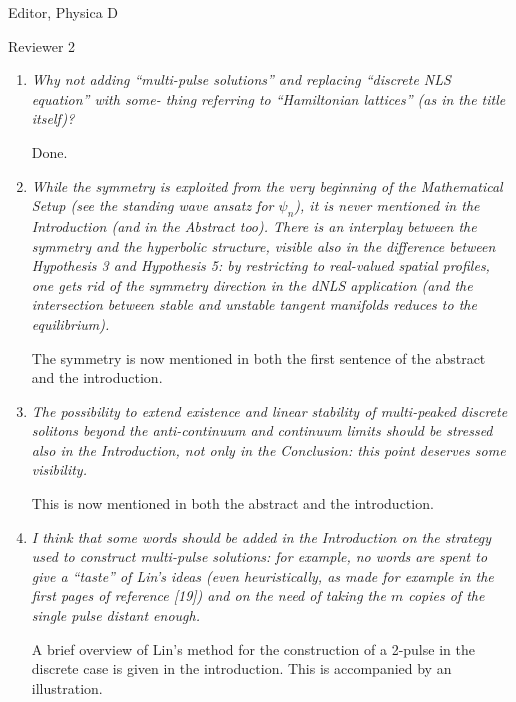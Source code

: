 \documentclass[11pt]{letter}
\begin{document}
\begin{letter}{Editor, Physica D}
\begin{enumerate}
\end{enumerate}

Reviewer 2
\begin{enumerate}
\item \emph{Why not adding ``multi-pulse solutions'' and replacing ``discrete NLS equation'' with some- thing referring to ``Hamiltonian lattices'' (as in the title itself)? }

\vspace{4mm}
Done.
\vspace{4mm}

\item \emph{While the symmetry is exploited from the very beginning of the Mathematical Setup (see the standing wave ansatz for $\psi_n$), it is never mentioned in the Introduction (and in the Abstract too). There is an interplay between the symmetry and the hyperbolic structure, visible also in the difference between Hypothesis 3 and Hypothesis 5: by restricting to real-valued spatial profiles, one gets rid of the symmetry direction in the dNLS application (and the intersection between stable and unstable tangent manifolds reduces to the equilibrium).}

\vspace{4mm}
The symmetry is now mentioned in both the first sentence of the abstract and the introduction.
\vspace{4mm}

\item \emph{The possibility to extend existence and linear stability of multi-peaked discrete solitons beyond the anti-continuum and continuum limits should be stressed also in the Introduction, not only in the Conclusion: this point deserves some visibility.}

\vspace{4mm}
This is now mentioned in both the abstract and the introduction.
\vspace{4mm}

\item \emph{I think that some words should be added in the Introduction on the strategy used to construct multi-pulse solutions: for example, no words are spent to give a “taste” of Lin’s ideas (even heuristically, as made for example in the first pages of reference [19]) and on the need of taking the $m$ copies of the single pulse distant enough.}

\vspace{4mm}
A brief overview of Lin's method for the construction of a 2-pulse in the discrete case is given in the introduction. This is accompanied by an illustration.
\vspace{4mm}


\end{enumerate}
\end{letter}
\end{document}
